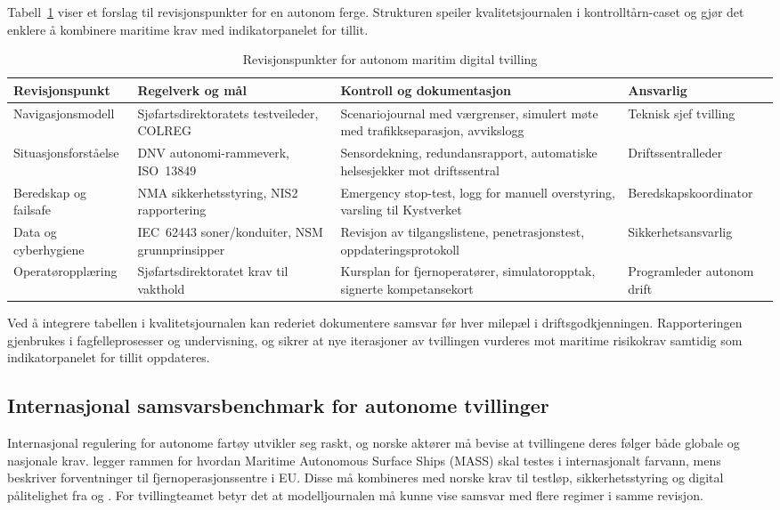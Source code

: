 Tabell~\ref{tab:maritim-tilsyn} viser et forslag til revisjonspunkter for en autonom ferge. Strukturen speiler kvalitetsjournalen i kontrolltårn-caset og gjør det enklere å kombinere maritime krav med indikatorpanelet for tillit.

\begin{table}[ht]
    \centering
    \caption{Revisjonspunkter for autonom maritim digital tvilling}
    \label{tab:maritim-tilsyn}
    \begin{tabular}{|p{3.1cm}|p{4.7cm}|p{4.7cm}|p{2.8cm}|}
        \hline
        \textbf{Revisjonspunkt} & \textbf{Regelverk og mål} & \textbf{Kontroll og dokumentasjon} & \textbf{Ansvarlig} \\
        \hline
        Navigasjonsmodell & Sjøfartsdirektoratets testveileder, COLREG & Scenariojournal med værgrenser, simulert møte med trafikkseparasjon, avvikslogg & Teknisk sjef tvilling \\
        \hline
        Situasjonsforståelse & DNV autonomi-rammeverk, ISO~13849 & Sensordekning, redundansrapport, automatiske helsesjekker mot driftssentral & Driftssentralleder \\
        \hline
        Beredskap og failsafe & NMA sikkerhetsstyring, NIS2 rapportering & Emergency stop-test, logg for manuell overstyring, varsling til Kystverket & Beredskapskoordinator \\
        \hline
        Data og cyberhygiene & IEC~62443 soner/konduiter, NSM grunnprinsipper & Revisjon av tilgangslistene, penetrasjonstest, oppdateringsprotokoll & Sikkerhetsansvarlig \\
        \hline
        Operatøropplæring & Sjøfartsdirektoratet krav til vakthold & Kursplan for fjernoperatører, simulatoropptak, signerte kompetansekort & Programleder autonom drift \\
        \hline
    \end{tabular}
\end{table}

Ved å integrere tabellen i kvalitetsjournalen kan rederiet dokumentere samsvar før hver milepæl i driftsgodkjenningen. Rapporteringen gjenbrukes i fagfelleprosesser og undervisning, og sikrer at nye iterasjoner av tvillingen vurderes mot maritime risikokrav samtidig som indikatorpanelet for tillit oppdateres.

\subsection{Internasjonal samsvarsbenchmark for autonome tvillinger}
Internasjonal regulering for autonome fartøy utvikler seg raskt, og norske aktører må bevise at tvillingene deres følger både globale og nasjonale krav. \citet{imo2023masscode} legger rammen for hvordan Maritime Autonomous Surface Ships (MASS) skal testes i internasjonalt farvann, mens \citet{emsa2024remote} beskriver forventninger til fjernoperasjonssentre i EU. Disse må kombineres med norske krav til testløp, sikkerhetsstyring og digital pålitelighet fra \citet{sdir2023autonomefartoy} og \citet{dnv2024autonomous}. For tvillingteamet betyr det at modelljournalen må kunne vise samsvar med flere regimer i samme revisjon.

